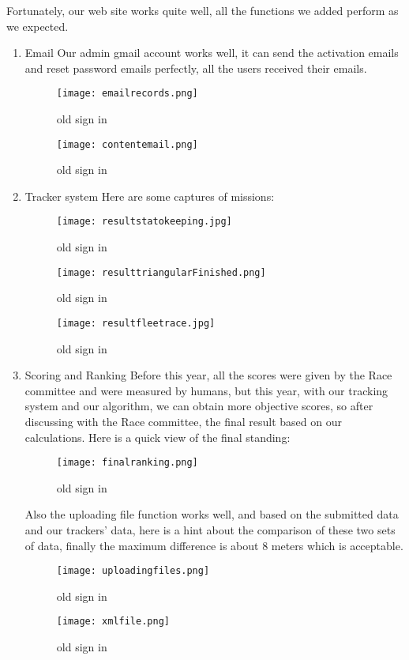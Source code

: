 Fortunately, our web site works quite well, all the functions we added perform as we expected. 
\begin{enumerate}
\item{Email}
Our admin gmail account works well, it can send the activation emails and reset password emails perfectly, all the users received their emails.
\begin{figure}[h!]
\centering
\texttt{[image: emailrecords.png]}
\caption{old sign in }
\label{fig-sample}
\end{figure}

\begin{figure}[h!]
\centering
\texttt{[image: contentemail.png]}
\caption{old sign in }
\label{fig-sample}
\end{figure}
\item{Tracker system}
Here are some captures of missions:
\begin{figure}[h!]
\centering
\texttt{[image: resultstatokeeping.jpg]}
\caption{old sign in }
\label{fig-sample}
\end{figure}
\begin{figure}[h!]
\centering
\texttt{[image: resulttriangularFinished.png]}
\caption{old sign in }
\label{fig-sample}
\end{figure}
\begin{figure}[h!]
\centering
\texttt{[image: resultfleetrace.jpg]}
\caption{old sign in }
\label{fig-sample}
\end{figure}
\item{Scoring and Ranking}
Before this year, all the scores were given by the Race committee and were measured by humans, but this year, with our tracking system and our algorithm, we can obtain more objective scores, so after discussing with the Race committee, the final result based on our calculations. Here is a quick view of the final standing:
\begin{figure}[h!]
\centering
\texttt{[image: finalranking.png]}
\caption{old sign in }
\label{fig-sample}
\end{figure}
Also the uploading file function works well, and based on the submitted data and our trackers' data, here is a hint about the comparison of these two sets of data, finally the maximum difference is about 8 meters which is acceptable.
\begin{figure}[h!]
\centering
\texttt{[image: uploadingfiles.png]}
\caption{old sign in }
\label{fig-sample}
\end{figure}
\begin{figure}[h!]
\centering
\texttt{[image: xmlfile.png]}
\caption{old sign in }
\label{fig-sample}
\end{figure}
\end{enumerate}